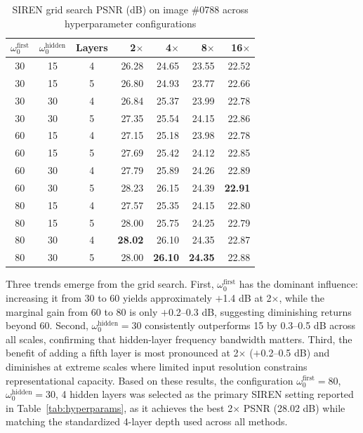 \documentclass[a4paper,oneside,10pt,ngerman,english]{scrartcl}
\begin{document}
\begin{table}[htbp]
\centering
\caption{SIREN grid search PSNR (dB) on image \#0788 across hyperparameter configurations}
\label{tab:siren_gridsearch}
\small
\setlength{\tabcolsep}{5pt}
\begin{tabular}{ccc rrrr}
\toprule
$\omega_0^{\text{first}}$ & $\omega_0^{\text{hidden}}$ & Layers & \textbf{2$\times$} & \textbf{4$\times$} & \textbf{8$\times$} & \textbf{16$\times$} \\
\midrule
30 & 15 & 4 & 26.28 & 24.65 & 23.55 & 22.52 \\
30 & 15 & 5 & 26.80 & 24.93 & 23.77 & 22.66 \\
30 & 30 & 4 & 26.84 & 25.37 & 23.99 & 22.78 \\
30 & 30 & 5 & 27.35 & 25.54 & 24.15 & 22.86 \\
\midrule
60 & 15 & 4 & 27.15 & 25.18 & 23.98 & 22.78 \\
60 & 15 & 5 & 27.69 & 25.42 & 24.12 & 22.85 \\
60 & 30 & 4 & 27.79 & 25.89 & 24.26 & 22.89 \\
60 & 30 & 5 & 28.23 & 26.15 & 24.39 & \textbf{22.91} \\
\midrule
80 & 15 & 4 & 27.57 & 25.35 & 24.15 & 22.80 \\
80 & 15 & 5 & 28.00 & 25.75 & 24.25 & 22.79 \\
80 & 30 & 4 & \textbf{28.02} & 26.10 & 24.35 & 22.87 \\
80 & 30 & 5 & 28.00 & \textbf{26.10} & \textbf{24.35} & 22.88 \\
\bottomrule
\end{tabular}
\end{table}

Three trends emerge from the grid search. First, $\omega_0^{\text{first}}$ has the dominant influence: increasing it from 30 to 60 yields approximately $+$1.4 dB at 2$\times$, while the marginal gain from 60 to 80 is only $+$0.2--0.3 dB, suggesting diminishing returns beyond 60. Second, $\omega_0^{\text{hidden}} = 30$ consistently outperforms 15 by 0.3--0.5 dB across all scales, confirming that hidden-layer frequency bandwidth matters. Third, the benefit of adding a fifth layer is most pronounced at 2$\times$ ($+$0.2--0.5 dB) and diminishes at extreme scales where limited input resolution constrains representational capacity. Based on these results, the configuration $\omega_0^{\text{first}} = 80$, $\omega_0^{\text{hidden}} = 30$, 4 hidden layers was selected as the primary SIREN setting reported in Table~\ref{tab:hyperparams}, as it achieves the best 2$\times$ PSNR (28.02 dB) while matching the standardized 4-layer depth used across all methods.
\end{document}
